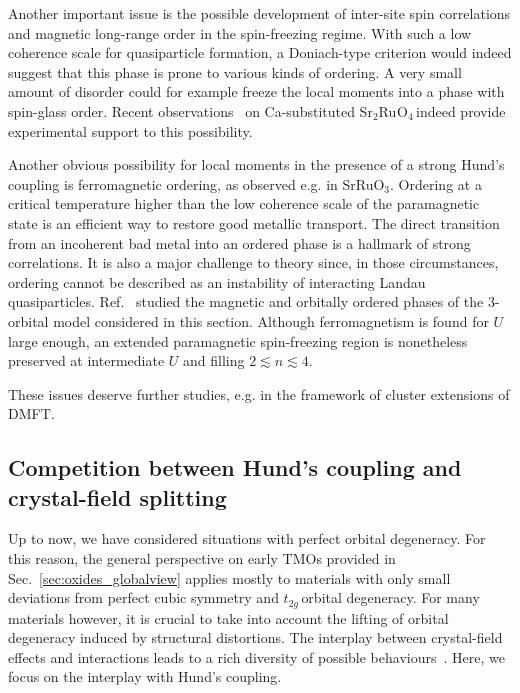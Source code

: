 \documentclass[]{ar2e-changed}%
\def\ttg{$t_{2g}\,$}
\def\SROtwo{Sr$_{2}$Ru$_{}$O$_{4}$\,}
\begin{document}
Another important issue is the possible development of inter-site spin correlations and magnetic long-range 
order in the spin-freezing regime. 
%
With such a low coherence scale for quasiparticle formation, a Doniach-type criterion would indeed suggest that this 
phase is prone to various kinds of ordering.
%
A very small amount of disorder could for example freeze the local moments into a phase with spin-glass order. 
Recent observations~\cite{carlo_nmat_2012} on Ca-substituted \SROtwo indeed provide experimental support to this possibility.  

Another obvious possibility for local moments in the presence of a strong Hund's coupling is ferromagnetic ordering, 
as observed e.g. in SrRuO$_3$. 
%
Ordering at a critical temperature higher than the low coherence scale of the paramagnetic state is  
an efficient way to restore good metallic transport. 
%
The direct transition from an incoherent bad metal into an ordered phase is a hallmark of 
strong correlations. It is also a major challenge to theory since, in those circumstances, ordering 
cannot be described as an instability of interacting Landau quasiparticles.
%
Ref.~\cite{ChanWernerMillis_3orbHub_orders} studied the magnetic and orbitally ordered phases of the 3-orbital model considered 
in this section. Although ferromagnetism is found for $U$ large enough, an extended paramagnetic spin-freezing region is 
nonetheless preserved at intermediate $U$ and filling $2\lesssim n \lesssim 4$. 

These issues deserve further studies, e.g. in the framework of cluster extensions of DMFT. 

\subsection{Competition between Hund's coupling and crystal-field splitting}
\label{sec:crystal_field}

Up to now, we have considered situations with perfect orbital degeneracy. For this reason, the general perspective 
on early TMOs provided in Sec.~\ref{sec:oxides_globalview} applies mostly to materials with only small deviations 
from perfect cubic symmetry and \ttg orbital degeneracy. 
%
For many materials however, it is crucial to take into account the lifting of orbital degeneracy induced by structural distortions. 
The interplay between crystal-field effects and interactions leads to a rich diversity of possible behaviours~\cite{TokuraNagaosa_OrbitalPhysics}. 
Here, we focus on the interplay with Hund's coupling. 
\end{document}
